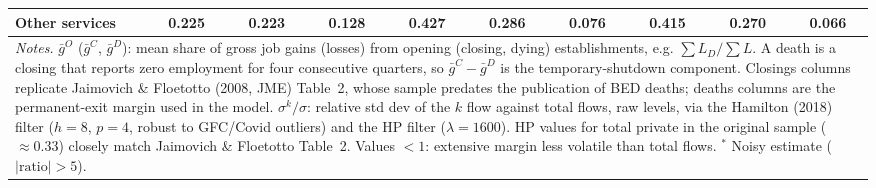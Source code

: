 \begin{table}[htbp]
\begin{tabular}{lccccccccc}
Other services & 0.225 & 0.223 & 0.128 & 0.427 & 0.286 & 0.076 & 0.415 & 0.270 & 0.066 \\
\midrule
\multicolumn{10}{p{0.98\linewidth}}{\footnotesize \textit{Notes.} $\bar{g}^O$ ($\bar{g}^C$, $\bar{g}^D$): mean share of gross job gains (losses) from opening (closing, dying) establishments, e.g. $\sum L_D/\sum L$. A death is a closing that reports zero employment for four consecutive quarters, so $\bar{g}^C-\bar{g}^D$ is the temporary-shutdown component. Closings columns replicate Jaimovich \& Floetotto (2008, JME) Table~2, whose sample predates the publication of BED deaths; deaths columns are the permanent-exit margin used in the model. $\sigma^k/\sigma$: relative std dev of the $k$ flow against total flows, raw levels, via the Hamilton (2018) filter ($h{=}8$, $p{=}4$, robust to GFC/Covid outliers) and the HP filter ($\lambda{=}1600$). HP values for total private in the original sample ($\approx 0.33$) closely match Jaimovich \& Floetotto Table~2. Values $<1$: extensive margin less volatile than total flows. $^{*}$ Noisy estimate ($|\text{ratio}|>5$).} \\
\bottomrule
\end{tabular}
\end{table}
